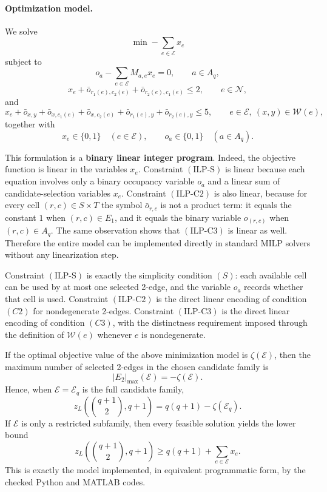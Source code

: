 \documentclass[10pt]{article}
\newcommand{\blue}[1]{#1}
\newcommand{\0}{\mathbf{0}}
\newcommand{\1}{\mathbf{1}}
\begin{document}
\paragraph{Optimization model.}
We solve
\[
\min -\sum_{e\in\mathcal E} x_e
\]
subject to
\begin{equation}
o_a-\sum_{e\in\mathcal E} M_{a,e}x_e = 0,
\qquad a\in A_q,
\tag{ILP-S}
\end{equation}
\begin{equation}
x_e+\bar o_{r_1(e),c_2(e)}+\bar o_{r_2(e),c_1(e)} \le 2,
\qquad e\in\mathcal N,
\tag{ILP-C2}
\end{equation}
and
\begin{equation}
x_e+\bar o_{x,y}+\bar o_{x,c_1(e)}+\bar o_{x,c_2(e)}+\bar o_{r_1(e),y}+\bar o_{r_2(e),y} \le 5,
\qquad e\in\mathcal E,\ (x,y)\in\mathcal W(e),
\tag{ILP-C3}
\end{equation}
together with
\[
x_e\in\{0,1\}\quad (e\in\mathcal E),
\qquad
 o_a\in\{0,1\}\quad (a\in A_q).
\]

This formulation is a \textbf{binary linear integer program}. Indeed, the objective function is linear in the variables \(x_e\). Constraint \((\mathrm{ILP}\text{-}\mathrm{S})\) is linear because each equation involves only a binary occupancy variable \(o_a\) and a linear sum of candidate-selection variables \(x_e\). Constraint \((\mathrm{ILP}\text{-}\mathrm{C2})\) is also linear, because for every cell \((r,c)\in S\times T\) the symbol \(\bar o_{r,c}\) is not a product term: it equals the constant \(1\) when \((r,c)\in E_1\), and it equals the binary variable \(o_{(r,c)}\) when \((r,c)\in A_q\). The same observation shows that \((\mathrm{ILP}\text{-}\mathrm{C3})\) is linear as well. Therefore the entire model can be implemented directly in standard MILP solvers without any linearization step.

Constraint \((\mathrm{ILP}\text{-}\mathrm{S})\) is exactly the simplicity condition \((S)\): each available cell can be used by at most one selected 2-edge, and the variable \(o_a\) records whether that cell is used. Constraint \((\mathrm{ILP}\text{-}\mathrm{C2})\) is the direct linear encoding of condition \((C2)\) for nondegenerate 2-edges. Constraint \((\mathrm{ILP}\text{-}\mathrm{C3})\) is the direct linear encoding of condition \((C3)\), with the distinctness requirement imposed through the definition of \(\mathcal W(e)\) whenever \(e\) is nondegenerate.

If the optimal objective value of the above minimization model is \(\zeta(\mathcal E)\), then the maximum number of selected 2-edges in the chosen candidate family is
\[
|E_2|_{\max}(\mathcal E)=-\zeta(\mathcal E).
\]
Hence, when \(\mathcal E=\mathcal E_q\) is the full candidate family,
\[
z_L\!\left(\binom{q+1}{2},q+1\right)=q(q+1)-\zeta(\mathcal E_q).
\]
If \(\mathcal E\) is only a restricted subfamily, then every feasible solution yields the lower bound
\[
z_L\!\left(\binom{q+1}{2},q+1\right)\ge q(q+1)+\sum_{e\in\mathcal E}x_e.
\]
\blue{This is exactly the model implemented, in equivalent programmatic form, by the checked Python and MATLAB codes.}
\end{document}
